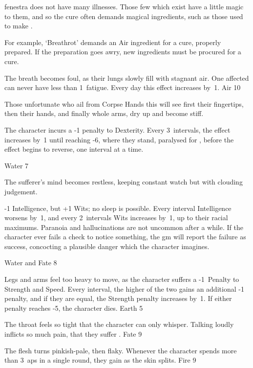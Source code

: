 \begin{multicols}{2}

\noindent
\Gls{fenestra} does not have many illnesses.
Those few which exist have a little magic to them, and so the cure often demands magical \glspl{ingredient}, such as those used to make .

For example, `Breathrot' demands an Air \gls{ingredient} for a cure, properly prepared.
If the preparation goes awry, new \glspl{ingredient} must be procured for a cure.

%
  {
    The breath becomes foul, as their lungs slowly fill with stagnant air.
    One affected can never have less than 1~\gls{fatigue}.
    Every day this effect increases by~1.
  }%
  {Air}%
  {10}

%
  {
    Those unfortunate who ail from Corpse Hands this will see first their fingertips, then their hands, and finally whole arms, dry up and become stiff.

    The character incurs a -1 penalty to Dexterity.
    Every 3~\glspl{interval}, the effect increases by~1 until reaching -6, where they stand, paralysed for , before the effect begins to reverse, one \gls{interval} at a time.
  }%
  {Water}%
  {7}

%
  {The sufferer's mind becomes restless, keeping constant watch but with clouding judgement.

    -1 Intelligence, but +1 Wits; no sleep is possible.
    Every \gls{interval} Intelligence worsens by~1, and every 2~\glspl{interval} Wits increases by~1, up to their racial maximums.%
    Paranoia and hallucinations are not uncommon after a while.
    If the character ever fails a check to notice something, the \gls{gm} will report the failure as success, concocting a plausible danger which the character imagines.}%
  {Water and Fate}%
  {8}

%
  {Legs and arms feel too heavy to move, as the character suffers a -1~Penalty to Strength and Speed.
  Every \gls{interval}, the higher of the two gains an additional -1 penalty, and if they are equal, the Strength penalty increases by~1.
  If either penalty reaches -5, the character dies.}%
  {Earth}%
  {5}

%
  {The throat feels so tight that the character can only whisper.
  Talking loudly inflicts so much pain, that they suffer .}%
  {Fate}%
  {9}

%
  {The flesh turns pinkish-pale, then flaky.
  Whenever the character spends more than 3~\glspl{ap} in a single round, they gain  as the skin splits.}%
  {Fire}%
  {9}

\end{multicols}
